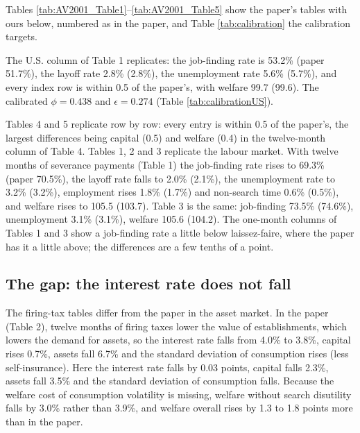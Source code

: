 \documentclass[11pt,fleqn]{article}
\begin{document}
Tables \ref{tab:AV2001_Table1}--\ref{tab:AV2001_Table5} show the paper's tables with ours below, numbered as in the paper, and Table \ref{tab:calibration} the calibration targets.

The U.S. column of Table 1 replicates: the job-finding rate is 53.2\% (paper 51.7\%), the layoff rate 2.8\% (2.8\%), the unemployment rate 5.6\% (5.7\%), and every index row is within 0.5 of the paper's, with welfare 99.7 (99.6). The calibrated $\phi=0.438$ and $\epsilon=0.274$ (Table \ref{tab:calibrationUS}).

Tables 4 and 5 replicate row by row: every entry is within 0.5 of the paper's, the largest differences being capital (0.5) and welfare (0.4) in the twelve-month column of Table 4. Tables 1, 2 and 3 replicate the labour market. With twelve months of severance payments (Table 1) the job-finding rate rises to 69.3\% (paper 70.5\%), the layoff rate falls to 2.0\% (2.1\%), the unemployment rate to 3.2\% (3.2\%), employment rises 1.8\% (1.7\%) and non-search time 0.6\% (0.5\%), and welfare rises to 105.5 (103.7). Table 3 is the same: job-finding 73.5\% (74.6\%), unemployment 3.1\% (3.1\%), welfare 105.6 (104.2). The one-month columns of Tables 1 and 3 show a job-finding rate a little below laissez-faire, where the paper has it a little above; the differences are a few tenths of a point.

\subsection{The gap: the interest rate does not fall}
\label{sec:gap}

The firing-tax tables differ from the paper in the asset market. In the paper (Table 2), twelve months of firing taxes lower the value of establishments, which lowers the demand for assets, so the interest rate falls from 4.0\% to 3.8\%, capital rises 0.7\%, assets fall 6.7\% and the standard deviation of consumption rises (less self-insurance). Here the interest rate falls by 0.03 points, capital falls 2.3\%, assets fall 3.5\% and the standard deviation of consumption falls. Because the welfare cost of consumption volatility is missing, welfare without search disutility falls by 3.0\% rather than 3.9\%, and welfare overall rises by 1.3 to 1.8 points more than in the paper.
\end{document}
